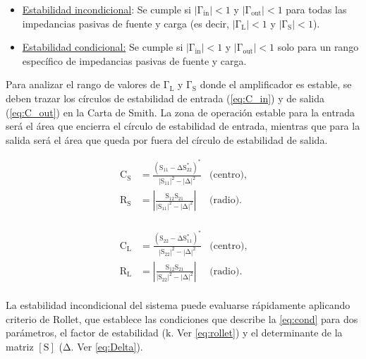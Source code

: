 \documentclass{article}
\begin{document}
\begin{itemize}
    \item \underline{Estabilidad incondicional}: Se cumple si $\mathrm{|\Gamma_{in}| < 1}$ y $\mathrm{|\Gamma_{out}| < 1}$ para todas las impedancias pasivas de fuente y carga (es decir, $\mathrm{|\Gamma_{L}| < 1}$ y $\mathrm{|\Gamma_{S}| < 1}$).

    \item \underline{Estabilidad condicional:} Se cumple si $\mathrm{|\Gamma_{in}| < 1}$ y $\mathrm{|\Gamma_{out}| < 1}$ solo para un rango específico de impedancias pasivas de fuente y carga.
\end{itemize}

Para analizar el rango de valores de $\mathrm{\Gamma_{L}}$ y $\mathrm{\Gamma_{S}}$ donde el amplificador es estable, se deben trazar los círculos de estabilidad de entrada (\autoref{eq:C_in}) y de salida (\autoref{eq:C_out}) en la Carta de Smith. La zona de operación estable para la entrada será el área que encierra el círculo de estabilidad de entrada, mientras que para la salida será el área que queda por fuera del círculo de estabilidad de salida.

\begin{equation}
    \begin{aligned}
        \mathrm{C_{S}} & \mathrm{= \frac{(S_{11} - \Delta S_{22}^{*})^{*}}{|S_{11}|^{2} - |\Delta|^{2}}} & \text{(centro),}\\
        \mathrm{R_{S}} & \mathrm{= \left| \frac{S_{12}S_{21}}{|S_{11}|^{2} - |\Delta|^{2}} \right|} & \text{(radio).}
    \end{aligned}
    \label{eq:C_in}
\end{equation}
\\

\begin{equation}
    \begin{aligned}
        \mathrm{C_{L}} & \mathrm{= \frac{(S_{22} - \Delta S_{11}^{*})^{*}}{|S_{22}|^{2} - |\Delta|^{2}}} & \text{(centro),}\\
        \mathrm{R_{L}} & \mathrm{= \left| \frac{S_{12}S_{21}}{|S_{22}|^{2} - |\Delta|^{2}} \right|} & \text{(radio).}
    \end{aligned}
    \label{eq:C_out}
\end{equation}
\\

La estabilidad incondicional del sistema puede evaluarse rápidamente aplicando criterio de Rollet, que establece las condiciones que describe la \autoref{eq:cond} para dos parámetros, el factor de estabilidad ($\mathrm{k}$. Ver \autoref{eq:rollet}) y el determinante de la matriz $\mathrm{[S]}$ ($\mathrm{\Delta}$. Ver \autoref{eq:Delta}).
\end{document}
